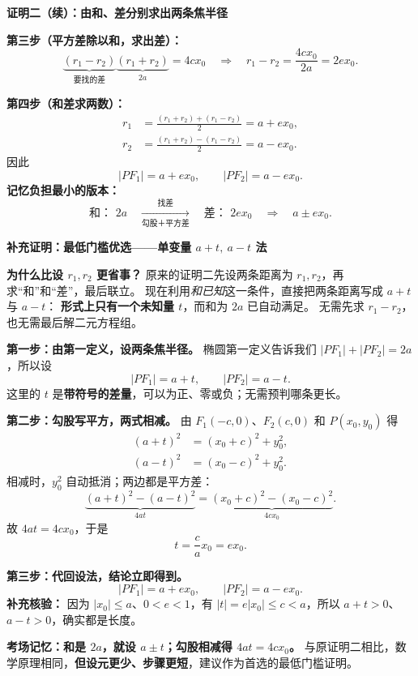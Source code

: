 \clearpage
\begin{proofbox}
\textbf{\textcolor{CProof}{证明二（续）：由和、差分别求出两条焦半径}}

\textbf{第三步（平方差除以和，求出差）：}
\[
 \underbrace{(r_1-r_2)}_{\text{要找的差}}
 \underbrace{(r_1+r_2)}_{2a}=4cx_0
 \quad\Longrightarrow\quad
 r_1-r_2=\frac{4cx_0}{2a}=2ex_0.
\]

\textbf{第四步（和差求两数）：}
\[
 \begin{aligned}
 r_1&=\frac{(r_1+r_2)+(r_1-r_2)}2=a+ex_0,\\
 r_2&=\frac{(r_1+r_2)-(r_1-r_2)}2=a-ex_0.
 \end{aligned}
\]
因此
\[
 \boxed{|PF_1|=a+ex_0,\qquad |PF_2|=a-ex_0}.
\]
\textbf{记忆负担最小的版本：}
\[
 \boxed{\text{和： }2a\quad\xrightarrow[\text{勾股＋平方差}]{\text{找差}}\quad
 \text{差： }2ex_0\quad\Longrightarrow\quad a\pm ex_0.}
\]

\end{proofbox}
\clearpage
\begin{proofbox}
\textbf{\textcolor{CProof}{补充证明：最低门槛优选——单变量 $a+t,\ a-t$ 法}}

\textbf{为什么比设 $r_1,r_2$ 更省事？}
原来的证明二先设两条距离为 $r_1,r_2$，再求“和”和“差”，最后联立。
现在利用\emph{和已知}这一条件，直接把两条距离写成 $a+t$ 与 $a-t$：
\textbf{形式上只有一个未知量 $t$}，而和为 $2a$ 已自动满足。
无需先求 $r_1-r_2$，也无需最后解二元方程组。

\medskip
\textbf{第一步：由第一定义，设两条焦半径。}
椭圆第一定义告诉我们 $|PF_1|+|PF_2|=2a$，所以设
\[
 \boxed{|PF_1|=a+t,\qquad |PF_2|=a-t.}
\]
这里的 $t$ 是\textbf{带符号的差量}，可以为正、零或负；无需预判哪条更长。

\textbf{第二步：勾股写平方，两式相减。}
由 $F_1(-c,0)$、$F_2(c,0)$ 和 $P(x_0,y_0)$ 得
\[
 \begin{aligned}
 (a+t)^2&=(x_0+c)^2+y_0^2,\\
 (a-t)^2&=(x_0-c)^2+y_0^2.
 \end{aligned}
\]
相减时，$y_0^2$ 自动抵消；两边都是平方差：
\[
 \underbrace{(a+t)^2-(a-t)^2}_{4at}
 =\underbrace{(x_0+c)^2-(x_0-c)^2}_{4cx_0}.
\]
故 $4at=4cx_0$，于是
\[
 \boxed{t=\frac ca x_0=ex_0}.
\]

\textbf{第三步：代回设法，结论立即得到。}
\[
 \boxed{|PF_1|=a+ex_0,\qquad |PF_2|=a-ex_0.}
\]
\textbf{补充核验：} 因为 $|x_0|\le a$、$0<e<1$，有
$|t|=e|x_0|\le c<a$，所以 $a+t>0$、$a-t>0$，确实都是长度。

\medskip
\textbf{\textcolor{CProof}{考场记忆：和是 $2a$，就设 $a\pm t$；勾股相减得 $4at=4cx_0$。}}
与原证明二相比，数学原理相同，\textbf{但设元更少、步骤更短}，建议作为首选的最低门槛证明。
\end{proofbox}

